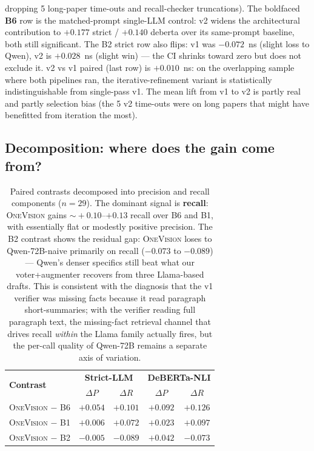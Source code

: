 \documentclass[11pt,a4paper]{article}
\begin{document}
\begin{table}[t]
{dropping 5 long-paper time-outs and recall-checker truncations).
The boldfaced \textbf{B6} row is the matched-prompt single-LLM
control: v2 widens the architectural contribution to $+0.177$
strict / $+0.140$ deberta over its same-prompt baseline, both still
significant. The B2 strict row also flips: v1 was $-0.072$~ns
(slight loss to Qwen), v2 is $+0.028$~ns (slight win) — the CI
shrinks toward zero but does not exclude it. v2 vs v1 paired (last
row) is $+0.010$~ns: on the overlapping sample where both pipelines
ran, the iterative-refinement variant is statistically indistinguishable
from single-pass v1. The mean lift from v1 to v2 is partly real and
partly selection bias (the 5 v2 time-outs were on long papers that
might have benefitted from iteration the most).}
\label{tab:contrasts}
\end{table}

\subsection{Decomposition: where does the gain come from?}

\begin{table}[t]
\centering
\small
\begin{tabular}{l|cc|cc}
\toprule
\multirow{2}{*}{\textbf{Contrast}}
  & \multicolumn{2}{c|}{\textbf{Strict-LLM}}
  & \multicolumn{2}{c}{\textbf{DeBERTa-NLI}} \\
& $\Delta P$ & $\Delta R$ & $\Delta P$ & $\Delta R$ \\
\midrule
\textsc{OneVision} $-$ B6  & $+0.054$ & $+0.101$ & $+0.092$ & $+0.126$ \\
\textsc{OneVision} $-$ B1  & $+0.006$ & $+0.072$ & $+0.023$ & $+0.097$ \\
\textsc{OneVision} $-$ B2  & $-0.005$ & $-0.089$ & $+0.042$ & $-0.073$ \\
\bottomrule
\end{tabular}
\caption{Paired contrasts decomposed into precision and recall
components ($n\!=\!29$). The dominant signal is \textbf{recall}:
\textsc{OneVision} gains $\sim\!+0.10$--$+0.13$ recall over B6 and
B1, with essentially flat or modestly positive precision. The
B2 contrast shows the residual gap: \textsc{OneVision} loses to
Qwen-72B-naive primarily on recall ($-0.073$ to $-0.089$) — Qwen's
denser specifics still beat what our voter+augmenter recovers from
three Llama-based drafts. This is consistent with the diagnosis
that the v1 verifier was missing facts because it read paragraph
short-summaries; with the verifier reading full paragraph text, the
missing-fact retrieval channel that drives recall \emph{within} the
Llama family actually fires, but the per-call quality of Qwen-72B
remains a separate axis of variation.}
\label{tab:contrast-decomp}
\end{table}
\end{document}
